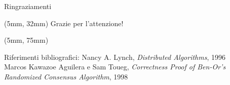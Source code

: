 \documentclass{beamer}
\begin{document}
{
    \beamertemplatenavigationsymbolsempty
    \begin{frame}{Ringraziamenti}
    \begin{textblock*}{\textwidth}(5mm, 32mm)
        \Huge Grazie per l'attenzione!
    \end{textblock*}
    \begin{textblock*}{0.6\textwidth}(5mm, 75mm)
        \begin{block}{Riferimenti bibliografici:}
            \tiny Nancy A. Lynch, \textit{Distributed Algorithms}, 1996 \\
            Marcos Kawazoe Aguilera e Sam Toueg, \textit{Correctness Proof of Ben-Or’s Randomized Consensus Algorithm}, 1998
        \end{block}
    \end{textblock*}
    \end{frame}
    \addtocounter{framenumber}{-1}
}
\end{document}
